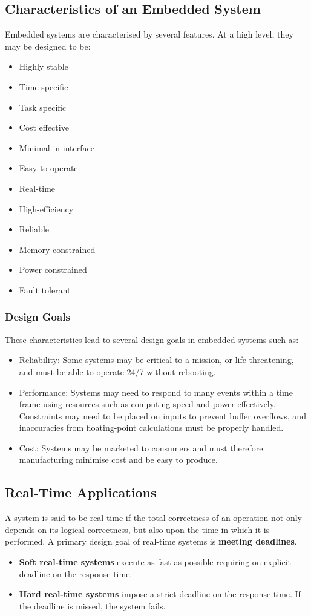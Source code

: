 \documentclass{article}
\begin{document}
\subsection{Characteristics of an Embedded System}
Embedded systems are characterised by several features. At a high
level, they may be designed to be:
\begin{itemize}
    \item Highly stable
    \item Time specific
    \item Task specific
    \item Cost effective
    \item Minimal in interface
    \item Easy to operate
    \item Real-time
    \item High-efficiency
    \item Reliable
    \item Memory constrained
    \item Power constrained
    \item Fault tolerant
\end{itemize}
\subsubsection{Design Goals}
These characteristics lead to several design goals in embedded systems
such as:
\begin{itemize}
    \item Reliability: Some systems may be critical to a mission, or
          life-threatening, and must be able to operate 24/7 without
          rebooting.
    \item Performance: Systems may need to respond to many events
          within a time frame using resources such as computing speed
          and power effectively. Constraints may need to be placed on
          inputs to prevent buffer overflows, and inaccuracies from
          floating-point calculations must be properly handled.
    \item Cost: Systems may be marketed to consumers and must therefore
          manufacturing minimise cost and be easy to produce.
\end{itemize}
\subsection{Real-Time Applications}
A system is said to be real-time if the total correctness of an
operation not only depends on its logical correctness, but also upon
the time in which it is performed. A primary design goal of real-time
systems is \textbf{meeting deadlines}.
\begin{itemize}
    \item \textbf{Soft real-time systems} execute as fast as possible requiring
          on explicit deadline on the response time.
    \item \textbf{Hard real-time systems} impose a strict deadline on the
          response time. If the deadline is missed, the system fails.
\end{itemize}
\end{document}
